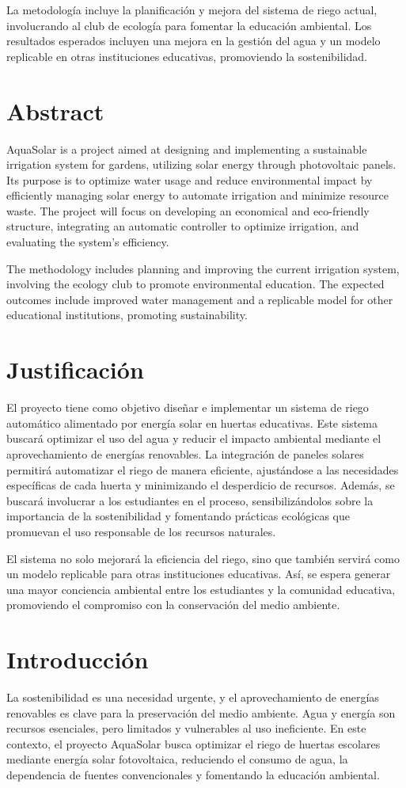 \documentclass[12pt]{article}
\begin{document}
La metodología incluye la planificación y mejora del sistema de riego actual, involucrando al club de ecología para fomentar la educación ambiental. Los resultados esperados incluyen una mejora en la gestión del agua y un modelo replicable en otras instituciones educativas, promoviendo la sostenibilidad.
\newpage
\section*{Abstract}
AquaSolar is a project aimed at designing and implementing a sustainable irrigation system for gardens, utilizing solar energy through photovoltaic panels. Its purpose is to optimize water usage and reduce environmental impact by efficiently managing solar energy to automate irrigation and minimize resource waste. The project will focus on developing an economical and eco-friendly structure, integrating an automatic controller to optimize irrigation, and evaluating the system's efficiency.

The methodology includes planning and improving the current irrigation system, involving the ecology club to promote environmental education. The expected outcomes include improved water management and a replicable model for other educational institutions, promoting sustainability.
\newpage
\section{Justificación}
El proyecto tiene como objetivo diseñar e implementar un sistema de riego automático alimentado por energía solar en huertas educativas. Este sistema buscará optimizar el uso del agua y reducir el impacto ambiental mediante el aprovechamiento de energías renovables. La integración de paneles solares permitirá automatizar el riego de manera eficiente, ajustándose a las necesidades específicas de cada huerta y minimizando el desperdicio de recursos. Además, se buscará involucrar a los estudiantes en el proceso, sensibilizándolos sobre la importancia de la sostenibilidad y fomentando prácticas ecológicas que promuevan el uso responsable de los recursos naturales.

El sistema no solo mejorará la eficiencia del riego, sino que también servirá como un modelo replicable para otras instituciones educativas. Así, se espera generar una mayor conciencia ambiental entre los estudiantes y la comunidad educativa, promoviendo el compromiso con la conservación del medio ambiente.
\newpage
\section{Introducción}
La sostenibilidad es una necesidad urgente, y el aprovechamiento de energías renovables es clave para la preservación del medio ambiente. Agua y energía son recursos esenciales, pero limitados y vulnerables al uso ineficiente. En este contexto, el proyecto AquaSolar busca optimizar el riego de huertas escolares mediante energía solar fotovoltaica, reduciendo el consumo de agua, la dependencia de fuentes convencionales y fomentando la educación ambiental.
\end{document}
